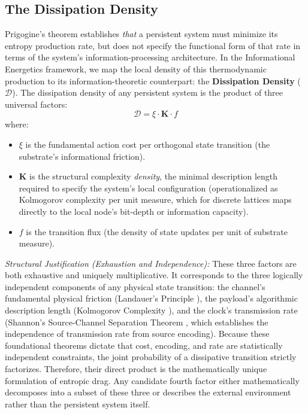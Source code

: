 \subsection{The Dissipation Density}
Prigogine's theorem establishes \textit{that} a persistent system must minimize its entropy production rate, but does not specify the functional form of that rate in terms of the system's information-processing architecture. In the Informational Energetics framework, we map the local density of this thermodynamic production to its information-theoretic counterpart: the \textbf{Dissipation Density} ($\mathcal{D}$). The dissipation density of any persistent system is the product of three universal factors:
\begin{equation}
    \mathcal{D} = \xi \cdot \mathbf{K} \cdot f
\end{equation}
where:
\begin{itemize}
    \item $\xi$ is the fundamental action cost per orthogonal state transition (the substrate's informational friction).
    \item $\mathbf{K}$ is the structural complexity \textit{density}, the minimal description length required to specify the system's local configuration (operationalized as Kolmogorov complexity per unit measure, which for discrete lattices maps directly to the local node's bit-depth or information capacity).
    \item $f$ is the transition flux (the density of state updates per unit of substrate measure).
\end{itemize}

\textit{Structural Justification (Exhaustion and Independence):} These three factors are both exhaustive and uniquely multiplicative. It corresponds to the three logically independent components of any physical state transition: the channel's fundamental physical friction (Landauer's Principle \cite{landauer_irreversibility_1961}), the payload's algorithmic description length (Kolmogorov Complexity \cite{kolmogorov_three_1968}), and the clock's transmission rate (Shannon's Source-Channel Separation Theorem \cite{shannon_communication_1949}, which establishes the independence of transmission rate from source encoding). Because these foundational theorems dictate that cost, encoding, and rate are statistically independent constraints, the joint probability of a dissipative transition strictly factorizes. Therefore, their direct product is the mathematically unique formulation of entropic drag. Any candidate fourth factor either mathematically decomposes into a subset of these three or describes the external environment rather than the persistent system itself.

